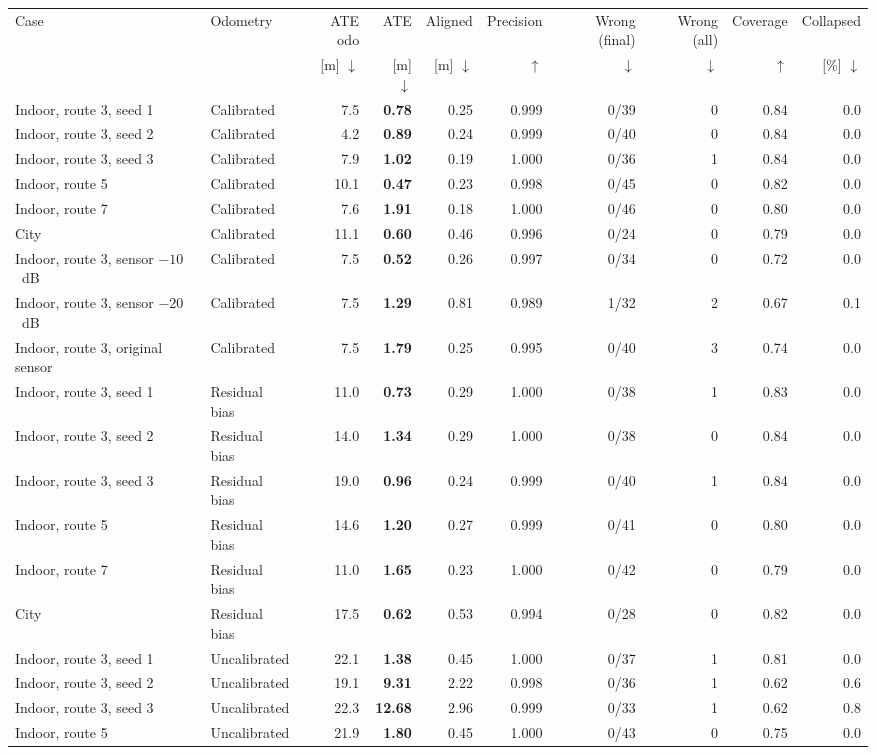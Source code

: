 \begin{tabular}{llrrrrrrrr}
\toprule
Case & Odometry & ATE odo & ATE & Aligned & Precision & Wrong (final) & Wrong (all) & Coverage & Collapsed \\
 & & [m] $\downarrow$ & [m] $\downarrow$ & [m] $\downarrow$ & $\uparrow$ & $\downarrow$ & $\downarrow$ & $\uparrow$ & [\%] $\downarrow$ \\
\midrule
Indoor, route 3, seed 1 & Calibrated & 7.5 & \textbf{0.78} & 0.25 & 0.999 & 0/39 & 0 & 0.84 & 0.0 \\
Indoor, route 3, seed 2 & Calibrated & 4.2 & \textbf{0.89} & 0.24 & 0.999 & 0/40 & 0 & 0.84 & 0.0 \\
Indoor, route 3, seed 3 & Calibrated & 7.9 & \textbf{1.02} & 0.19 & 1.000 & 0/36 & 1 & 0.84 & 0.0 \\
Indoor, route 5 & Calibrated & 10.1 & \textbf{0.47} & 0.23 & 0.998 & 0/45 & 0 & 0.82 & 0.0 \\
Indoor, route 7 & Calibrated & 7.6 & \textbf{1.91} & 0.18 & 1.000 & 0/46 & 0 & 0.80 & 0.0 \\
City & Calibrated & 11.1 & \textbf{0.60} & 0.46 & 0.996 & 0/24 & 0 & 0.79 & 0.0 \\
Indoor, route 3, sensor $-10$~dB & Calibrated & 7.5 & \textbf{0.52} & 0.26 & 0.997 & 0/34 & 0 & 0.72 & 0.0 \\
Indoor, route 3, sensor $-20$~dB & Calibrated & 7.5 & \textbf{1.29} & 0.81 & 0.989 & 1/32 & 2 & 0.67 & 0.1 \\
Indoor, route 3, original sensor & Calibrated & 7.5 & \textbf{1.79} & 0.25 & 0.995 & 0/40 & 3 & 0.74 & 0.0 \\
\midrule
Indoor, route 3, seed 1 & Residual bias & 11.0 & \textbf{0.73} & 0.29 & 1.000 & 0/38 & 1 & 0.83 & 0.0 \\
Indoor, route 3, seed 2 & Residual bias & 14.0 & \textbf{1.34} & 0.29 & 1.000 & 0/38 & 0 & 0.84 & 0.0 \\
Indoor, route 3, seed 3 & Residual bias & 19.0 & \textbf{0.96} & 0.24 & 0.999 & 0/40 & 1 & 0.84 & 0.0 \\
Indoor, route 5 & Residual bias & 14.6 & \textbf{1.20} & 0.27 & 0.999 & 0/41 & 0 & 0.80 & 0.0 \\
Indoor, route 7 & Residual bias & 11.0 & \textbf{1.65} & 0.23 & 1.000 & 0/42 & 0 & 0.79 & 0.0 \\
City & Residual bias & 17.5 & \textbf{0.62} & 0.53 & 0.994 & 0/28 & 0 & 0.82 & 0.0 \\
\midrule
Indoor, route 3, seed 1 & Uncalibrated & 22.1 & \textbf{1.38} & 0.45 & 1.000 & 0/37 & 1 & 0.81 & 0.0 \\
Indoor, route 3, seed 2 & Uncalibrated & 19.1 & \textbf{9.31} & 2.22 & 0.998 & 0/36 & 1 & 0.62 & 0.6 \\
Indoor, route 3, seed 3 & Uncalibrated & 22.3 & \textbf{12.68} & 2.96 & 0.999 & 0/33 & 1 & 0.62 & 0.8 \\
Indoor, route 5 & Uncalibrated & 21.9 & \textbf{1.80} & 0.45 & 1.000 & 0/43 & 0 & 0.75 & 0.0 \\
\bottomrule
\end{tabular}
